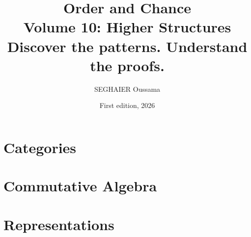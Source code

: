 \documentclass[11pt,openany]{book}
\title{\Huge\textbf{Order and Chance}\\[0.4em]\LARGE Volume 10: Higher Structures\\[0.6em]
\Large Discover the patterns. Understand the proofs.}
\author{SEGHAIER Oussama}
\date{First edition, 2026}
\begin{document}
\frontmatter
\makecover
\maketitle

\tableofcontents

\mainmatter

\part{Categories}


\part{Commutative Algebra}




\part{Representations}





\end{document}

